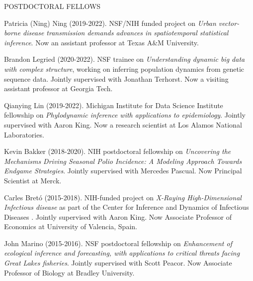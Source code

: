 \begin{reflist}{POSTDOCTORAL FELLOWS}

\item{Patricia (Ning) Ning } (2019-2022). NSF/NIH funded project on {\it Urban vector-borne disease transmission demands advances in spatiotemporal statistical inference}. Now an assistant professor at Texas A\&M University.

  
\item{Brandon Legried } (2020-2022). NSF trainee on {\it Understanding dynamic big data with complex structure}, working on inferring population dynamics from genetic sequence data. Jointly supervised with Jonathan Terhorst. Now a visiting assistant professor at Georgia Tech.
  
\item{Qianying Lin } (2019-2022). Michigan Institute for Data Science Institute fellowship on {\it Phylodynamic inference with applications to epidemiology}.  Jointly supervised with Aaron King. Now a research scientist at Los Alamos National Laboratories.
  
\item{Kevin Bakker} (2018-2020). NIH postdoctoral fellowship on {\it Uncovering the Mechanisms Driving Seasonal Polio Incidence: A Modeling Approach Towards Endgame Strategies}. Jointly supervised with Mercedes Pascual. Now Principal Scientist at Merck.

\item{Carles Bret\'{o}} (2015-2018). NIH-funded project on {\it X-Raying High-Dimensional Infectious disease} as part of the Center for Inference and Dynamics of Infectious Diseases .  Jointly supervised with Aaron King. Now Associate Professor of Economics at University of Valencia, Spain.

\item{John Marino} (2015-2016). NSF postdoctoral fellowship on {\it Enhancement of ecological inference and forecasting, with applications to critical threats facing Great Lakes fisheries}. Jointly supervised with Scott Peacor. Now Associate Professor of Biology at Bradley University.
  
\end{reflist}

\lsp

